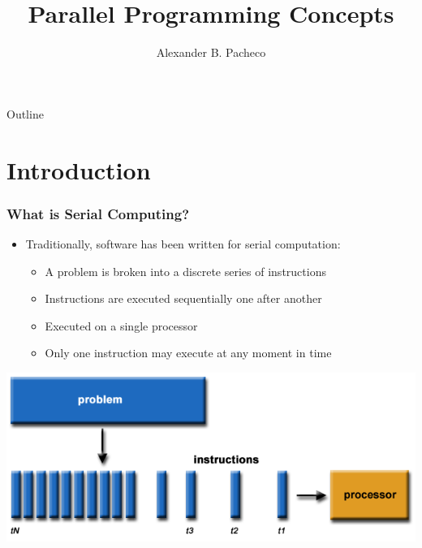 \documentclass[10pt,t]{beamer}
\title{Parallel Programming Concepts}
\subtitle{}
\author{Alexander B. Pacheco}
\institute{\href{http://researchcomputing.lehigh.edu}{LTS Research Computing}}
\begin{document}
\begin{frame}
  \titlepage
\end{frame}

\begin{frame}[c]{Outline}
  \tableofcontents
\end{frame}

\section{Introduction}
\begin{frame}
\frametitle{What is Serial Computing?}
\begin{itemize}
\item Traditionally, software has been written for serial computation:
\begin{itemize}
\item A problem is broken into a discrete series of instructions
\item Instructions are executed sequentially one after another
\item Executed on a single processor
\item Only one instruction may execute at any moment in time
\end{itemize}
\end{itemize}
\includegraphics[width=\textwidth]{./serialProblem}
\end{frame}
\end{document}
